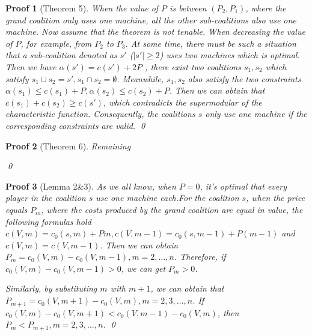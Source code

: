 \documentclass[UTF8]{article}
\newtheorem{pf}{\hspace{2em}Proof}
\begin{document}
\begin{pf}[Theorem 5]
When the value of $P$ is between $(P_2,P_1)$, where the grand coalition only uses one machine, all the other sub-coalitions also use one machine. Now assume that the theorem is not tenable. When decreasing the value of $P$, for example, from $P_2$ to $P_3$. At some time, there must be such a situation that a sub-coalition denoted as $s'$ ($|s'| \geq 2 $) uses two machines which is optimal. Then we have $ \alpha(s') = c(s') +2P $ , there exist two coalitions $s_1,s_2$ which satisfy $ s_1 \cup s_2 = s',s_1 \cap s_2 = \emptyset $.
Meanwhile, $s_1,s_2$ also satisfy the two constraints $\alpha(s_1) \leq c(s_1) + P , \alpha(s_2) \leq c(s_2) + P $. Then we can obtain that $ c(s_1) + c(s_2) \geq c(s') $, which contradicts the supermodular of the characteristic function.
Consequently, the coalitions $s$ only use one machine if the corresponding constraints are valid.
\qed
\end{pf}

\begin{pf}[Theorem 6]

Remaining

\qed
\end{pf}

\begin{pf}[Lemma 2\&3]
As we all know, when $ P=0 $, it's optimal that every player in the coalition $s$ use one machine each.For the coalition $s$, when the price equals $P_m$, where the costs produced by the grand coalition are equal in value, the following formulas hold
$c(V,m)=c_0(s,m)+Pm, c(V,m-1)=c_0(s,m-1)+P(m-1)$ and $c(V,m)=c(V,m-1)$. Then we can obtain $P_m = c_0(V,m)- c_0(V,m-1), m=2,\ldots,n$.
Therefore, if $ c_0(V,m)- c_0(V,m-1) > 0 $, we can get $P_m > 0$.

Similarly, by substituting $m$ with $m+1$, we can obtain that $P_{m+1} = c_0(V,m+1)- c_0(V,m), m=2,3,\ldots,n$. If $c_0 (V,m) - c_0 (V,m+1) < c_0 (V,m-1) - c_0 (V,m)$, then $P_m < P_{m+1}, m=2,3,\ldots,n$.
\qed
\end{pf}
\end{document}
